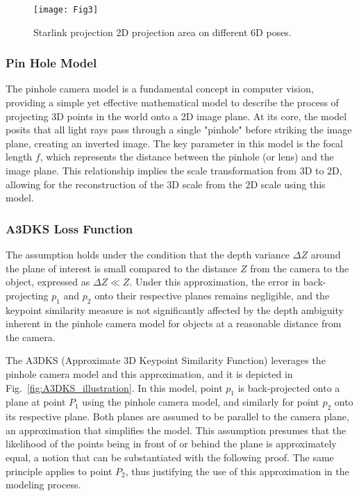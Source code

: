 \documentclass[a4paper,fleqn]{cas-sc}
\begin{document}
\begin{figure}[!htbp]
	\centering
	\texttt{[image: Fig3]} 
	\caption{Starlink projection 2D projection area on different 6D poses.}
	\label{fig:Obj_Proj1}
\end{figure}

\subsubsection{Pin Hole Model}
The pinhole camera model is a fundamental concept in computer vision, providing a simple yet effective mathematical model to describe the process of projecting 3D points in the world onto a 2D image plane. At its core, the model posits that all light rays pass through a single "pinhole" before striking the image plane, creating an inverted image. The key parameter in this model is the focal length $f$, which represents the distance between the pinhole (or lens) and the image plane. This relationship implies the scale transformation from 3D to 2D, allowing for the reconstruction of the 3D scale from the 2D scale using this model.

\subsubsection{A3DKS Loss Function}
The assumption holds under the condition that the depth variance $\Delta Z$ around the plane of interest is small compared to the distance $Z$ from the camera to the object, expressed as $\Delta Z \ll Z$. Under this approximation, the error in back-projecting $p_1$ and $p_2$ onto their respective planes remains negligible, and the keypoint similarity measure is not significantly affected by the depth ambiguity inherent in the pinhole camera model for objects at a reasonable distance from the camera.

The A3DKS (Approximate 3D Keypoint Similarity Function) leverages the pinhole camera model and this approximation, and it is depicted in Fig.~\ref{fig:A3DKS_illustration}. In this model, point  $p_1$  is back-projected onto a plane at point  $P_1$  using the pinhole camera model, and similarly for point  $p_2 $ onto its respective plane. Both planes are assumed to be parallel to the camera plane, an approximation that simplifies the model. This assumption presumes that the likelihood of the points being in front of or behind the plane is approximately equal, a notion that can be substantiated with the following proof. The same principle applies to point $P_2$, thus justifying the use of this approximation in the modeling process.
\end{document}
